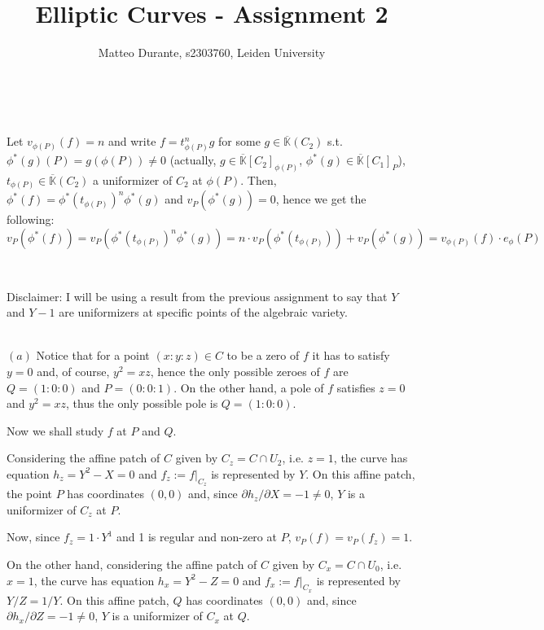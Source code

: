 \documentclass{article}
\newcommand{\numberset}{\mathbb}
\newcommand{\K}{\numberset{K}}
\newcommand{\exercise}[1]{\noindent {\bf Exercise #1}}
\begin{document}
\title{Elliptic Curves - Assignment 2}

\author{Matteo Durante, s2303760, Leiden University}

\maketitle


~\\
\exercise{1.a}

Let $v_{\phi(P)}(f)=n$ and write $f=t_{\phi(P)}^ng$ for some $g\in\overline{\K}(C_2)$ s.t.
$\phi^*(g)(P)=g(\phi(P))\neq 0$ (actually, $g\in\overline{\K}[C_2]_{\phi(P)}$,
$\phi^*(g)\in\overline{\K}[C_1]_P$), 
$t_{\phi(P)}\in\overline{\K}(C_2)$ a uniformizer of $C_2$
at $\phi(P)$. Then, $\phi^*(f)=\phi^*(t_{\phi(P)})^n\phi^*(g)$ and $v_{P}
(\phi^*(g))=0$, hence we get the following:
$$v_P(\phi^*(f))=v_P(\phi^*(t_{\phi(P)})^n\phi^*(g))=n\cdot
v_P(\phi^*(t_{\phi(P)}))+v_P(\phi^*(g))=v_{\phi(P)}(f)\cdot e_{\phi}(P)$$


~\\
\exercise{2}

Disclaimer: I will be using a result from the previous assignment to say that
$Y$ and $Y-1$ are uniformizers at specific points of the algebraic variety.

~\\
$(a)$ Notice that for a point $(x:y:z)\in C$ to be a zero of $f$ it has to
satisfy $y=0$ and, of course, $y^2=xz$, hence the only possible zeroes of $f$
are $Q=(1:0:0)$ and $P=(0:0:1)$. On the other hand, a pole of $f$ satisfies
$z=0$ and $y^2=xz$, thus the only possible pole is $Q=(1:0:0)$.

Now we shall study $f$ at $P$ and $Q$.

Considering the affine patch of $C$ given by $C_z=C\cap U_2$, i.e. $z=1$, the
curve has equation $h_z=Y^2-X=0$ and $f_z:=f|_{C_z}$ is represented by $Y$. On this affine
patch, the point $P$ has coordinates $(0,0)$ and, since
$\partial{h_z}/\partial{X}=-1\neq 0$, $Y$ is a uniformizer of $C_z$ at $P$.

Now, since $f_z=1\cdot Y^1$ and 1 is regular and non-zero at $P$, $v_P(f)=v_P(f_z)=1$.

On the other hand, considering the affine patch of $C$ given by $C_x=C\cap
U_0$, i.e. $x=1$, the curve has equation $h_x=Y^2-Z=0$ and $f_x:=f|_{C_x}$ is
represented by $Y/Z=1/Y$. On this affine patch, $Q$ has coordinates $(0,0)$ and,
since $\partial{h_x}/\partial{Z}=-1\neq 0$, $Y$ is a uniformizer of $C_x$ at $Q$.
\end{document}
